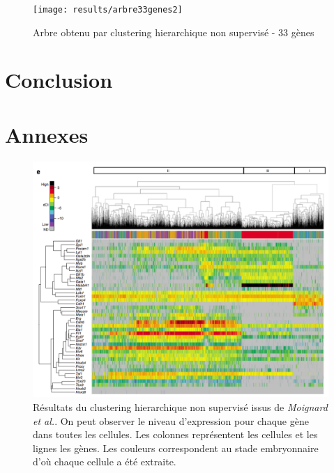 \documentclass[fleqn,11pt]{SelfArx} %
\providecommand\phantomsection{}
\begin{document}
\begin{figure}[ht]
\centering
\texttt{[image: results/arbre33genes2]}
\caption{Arbre obtenu par clustering hierarchique non supervisé - 33 gènes}
\label{fig:arbre33}
\end{figure}



\newpage
\section*{Conclusion}



\newpage
\phantomsection



\newpage
\section*{Annexes}

\begin{figure}[ht]
\centering
\includegraphics[width=\linewidth]{images/article2}
\caption{Résultats du clustering hierarchique non supervisé issus de \textit{Moignard et al.}. On peut observer le niveau d'expression pour chaque gène dans toutes les cellules. Les colonnes représentent les cellules et les lignes les gènes. Les couleurs correspondent au stade embryonnaire d'où chaque cellule a été extraite.}
\label{fig:artcile2}
\end{figure}
\end{document}
